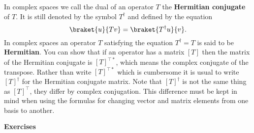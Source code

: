 In complex spaces we call the dual of an operator $T$ the \textbf{Hermitian conjugate} of $T$.  It is still denoted by the symbol $T^{\dag}$ and defined by the equation
\begin{displaymath} \braket{u}{Tv} = \braket{T^{\dag}u}{v}. \end{displaymath}
In complex spaces an operator $T$ satisfying the equation $T^{\dag} = T$ is said to be \textbf{Hermitian}.  You can show that if an operator has a matrix $[T]$ then the matrix of the Hermitian conjugate is $[T]^{\top *}$, which means the complex conjugate of the transpose.  Rather than write $[T]^{\top *}$ which is cumbersome it is usual to write $[T]^{\dag}$ for the Hermitian conjugate matrix.  Note that $[T]^{\dag}$ is not the same thing as $[T]^{\top}$, they differ by complex conjugation.  This difference must be kept in mind when using the formulas for changing vector and matrix elements from one basis to another. 

\begin{flushleft}\textbf{Exercises}\end{flushleft}